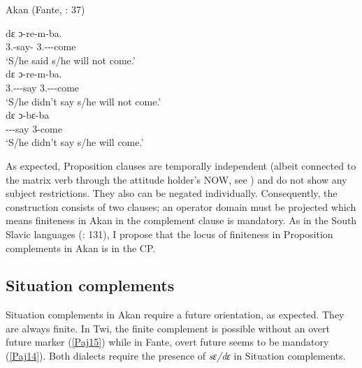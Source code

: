 \documentclass[output=paper]{langscibook}
\begin{document}
\begin{exe}
\ex \label{Paj13} Akan (Fante, \citealt{osam1998}: 37)
\begin{xlist}

\ex \label{Paj13a} 
 {d{ɛ}} {{ɔ}-re-m-ba.} \\
    3{\sg}.{\subj}-say-{\compl} {\comp} 3{\sg}.{\subj}-{\prog}--come\\
\glt `S/he said s/he will not come.’\\

\ex \label{Paj13b} 
 {d{ɛ}} {{ɔ}-re-m-ba.} \\
    3{\sg}.{\subj}-{\compl}--say {\comp} 3{\sg}.{\subj}-{\prog}--come\\
\glt `S/he didn't say s/he will not come.’\\

\ex \label{Paj13c} 
 dɛ ͻ-bɛ-ba \\
-\compl--say {\comp} 3-come\\
\glt `S/he didn’t say s/he will come.'\\

\end{xlist}
\end{exe}
 

As expected, Proposition clauses are temporally independent (albeit connected to the matrix verb through the attitude holder’s NOW, see \citealt{wurmbrand2014a}) and do not show any subject restrictions. They also can be negated individually. Consequently, the construction consists of two clauses; an operator domain must be projected which means finiteness in Akan in the complement clause is mandatory. As in the South Slavic languages (\citealt{wurmbrandetal2020}: 131), I propose that the locus of finiteness in Proposition complements in Akan is in the CP. 

\subsection{Situation complements}

Situation complements in Akan require a future orientation, as expected. They are always finite. In Twi, the finite complement is possible without an overt future marker (\ref{Paj15}) while in Fante, overt future seems to be mandatory (\ref{Paj14}). Both dialects require the presence of \textit{sɛ/dɛ} in Situation complements. 
\end{document}
